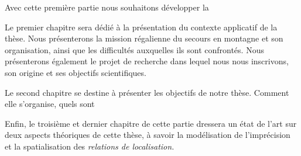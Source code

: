 Avec cette première partie nous souhaitons développer la 



Le premier chapitre sera dédié à la présentation du contexte
applicatif de la thèse. Nous présenterons la mission régalienne du
secours en montagne et son organisation, ainsi que les difficultés
auxquelles ils sont confrontés.
%
Nous présenterons également le projet de recherche dans lequel nous
nous inscrivons, son origine et ses objectifs scientifiques.

Le second chapitre se destine à présenter les objectifs de notre
thèse. Comment elle s'organise, quels sont

Enfin, le troisième et dernier chapitre de cette partie dressera un
état de l'art sur deux aspects théoriques de cette thèse, à savoir la
modélisation de l'imprécision et la spatialisation des \emph{relations
  de localisation.}

